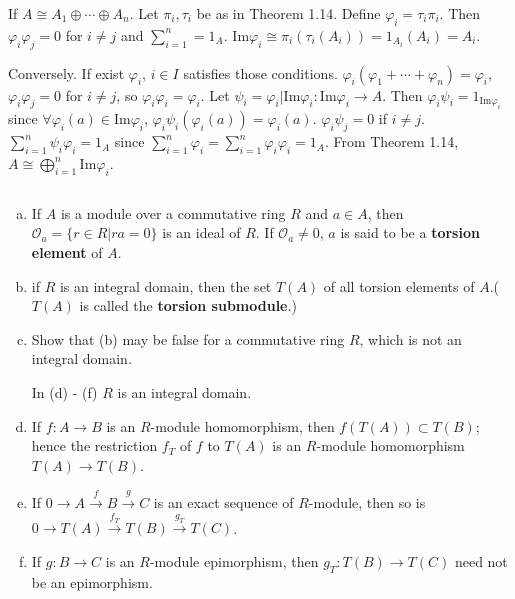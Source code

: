 \begin{answer}
    If $A\cong A_{1}\oplus \cdots\oplus A_{n}$. Let $\pi_{i},\tau_{i}$ be as in Theorem 1.14. Define $\varphi_{i}=\tau_{i}\pi_{i}$. Then $\varphi_{i}\varphi_{j}=0$ for $i\neq j$ and $\sum\limits_{i=1}^{n}=1_{A}$. $\mathrm{Im}\varphi_{i}\cong \pi_{i}(\tau_{i}(A_{i}))=1_{A_{i}}(A_{i})=A_{i}$.

    Conversely. If exist $\varphi_{i}$, $i\in I$ satisfies those conditions. $\varphi_{i}(\varphi_{1}+\cdots+\varphi_{n})=\varphi_{i}$, $\varphi_{i}\varphi_{j}=0$ for $i\neq j$, so $\varphi_{i}\varphi_{i}=\varphi_{i}$. Let $\psi_{i}=\varphi_{i}|\mathrm{Im}\varphi_{i}:\mathrm{Im}\varphi_{i}\to A$. Then $\varphi_{i}\psi_{i}=1_{\mathrm{Im}\varphi_{i}}$ since $\forall \varphi_{i}(a)\in \mathrm{Im}\varphi_{i}$, $\varphi_{i}\psi_{i}(\varphi_{i}(a))=\varphi_{i}(a)$. $\varphi_{i}\psi_{j}=0$ if $i\neq j$. $\sum\limits_{i=1}^{n}\psi_{i}\varphi_{i}=1_{A}$ since $\sum\limits_{i=1}^{n}\varphi_{i}=\sum\limits_{i=1}^{n}\varphi_{i}\varphi_{i}=1_{A}$. From Theorem 1.14, $A\cong \bigoplus\limits_{i=1}^{n}\mathrm{Im}\varphi_{i}$.
\end{answer}

$$ $$

\begin{ex}
    \begin{enumerate}[(a)]
        \item If $A$ is a module over a commutative ring $R$ and $a\in A$, then $\mathcal{O}_{a}=\{r\in R|ra=0\}$ is an ideal of $R$. If $\mathcal{O}_{a}\neq 0$, $a$ is said to be a \textbf{torsion element} of $A$.
        \item if $R$ is an integral domain, then the set $T(A)$ of all torsion elements of $A$.($T(A)$ is called the \textbf{torsion submodule}.)
        \item Show that (b) may be false for a commutative ring $R$, which is not an integral domain.
        
        In (d) - (f) $R$ is an integral domain.
        \item If $f:A\to B$ is an $R$-module homomorphism, then $f(T(A))\subset T(B)$; hence the restriction $f_{T}$ of $f$ to $T(A)$ is an $R$-module homomorphism $T(A)\to T(B)$.
        \item If $0\to A\xrightarrow{f} B\xrightarrow{g} C$ is an exact sequence of $R$-module, then so is $0\to T(A)\xrightarrow{f_T} T(B)\xrightarrow{g_T}T(C)$.
        \item If $g:B\to C$ is an $R$-module epimorphism, then $g_{T}:T(B)\to T(C)$ need not be an epimorphism.
    \end{enumerate}
\end{ex}

